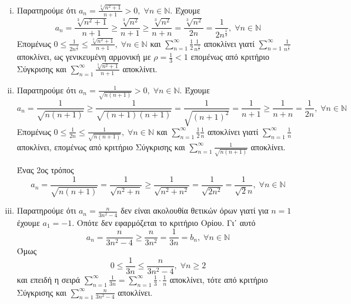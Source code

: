 \begin{enumerate}
\begin{enumerate}[i)]
      \item Παρατηρούμε ότι $ a_{n} = \frac{\sqrt[3]{n^{2}+1}}{n+1} > 0, \; 
        \forall n \in \mathbb{N} $. Έχουμε
        \[
          a_{n} = \frac{\sqrt[3]{n^{2}+1}}{n+1} \geq \frac{\sqrt[3]{n^{2}}}{n+1} 
          \geq \frac{\sqrt[3]{n^{2}}}{n+n} = \frac{\sqrt[3]{n^{2}}}{2n} =
          \frac{1}{2n^{\frac{1}{3}}}, \; \forall n \in \mathbb{N}
        \] 
        Επομένως $ 0 \leq \frac{1}{2n^{\frac{1}{3}}} \leq 
        \frac{\sqrt[3]{n^{2}+1} }{n+1}, \; \forall n \in \mathbb{N} $ και 
        $ \sum_{n=1}^{\infty} \frac{1}{2} \frac{1}{n^{\frac{1}{3}}} $ 
        αποκλίνει γιατί $ \sum_{n=1}^{\infty} \frac{1}{n^{\frac{1}{3}}} $ 
        αποκλίνει, ως γενικευμένη αρμονική με $ \rho = \frac{1}{3} < 1 $ 
        επομένως από κριτήριο Σύγκρισης και $ \sum_{n=1}^{\infty} 
        \frac{\sqrt[3]{n^{2}+1}}{n+1} $ αποκλίνει.

      \item Παρατηρούμε ότι $ a_{n} = \frac{1}{\sqrt{n(n+1)}} > 0, \; \forall n 
        \in \mathbb{N} $. Έχουμε
        \[
          a_{n} = \frac{1}{\sqrt{n(n+1)}} \geq \frac{1}{\sqrt{(n+1)(n+1)}} = 
          \frac{1}{\sqrt{(n+1)^{2}} } = \frac{1}{n+1} \geq \frac{1}{n+n} = 
          \frac{1}{2n}, \; \forall n \in \mathbb{N}   
        \] 
        Επομένως $ 0 \leq \frac{1}{2n} \leq \frac{1}{\sqrt{n(n+1)}}, \; 
        \forall n \in \mathbb{N} $ και $ \sum_{n=1}^{\infty} \frac{1}{2} 
        \frac{1}{n} $ αποκλίνει γιατί $ \sum_{n=1}^{\infty} \frac{1}{n} $ 
        αποκλίνει, επομένως από κριτήριο Σύγκρισης και 
        $ \sum_{n=1}^{\infty} \frac{1}{\sqrt{n(n+1)}} $ αποκλίνει.

        \begin{rem}
          Ένας 2ος τρόπος
          \[
            a_{n} = \frac{1}{\sqrt{n(n+1)}} = \frac{1}{\sqrt{n^{2}+n}} \geq 
            \frac{1}{\sqrt{n^{2}+n^{2}}} = \frac{1}{\sqrt{2n^{2}}} = 
            \frac{1}{\sqrt{2}n}, \; \forall n \in \mathbb{N}   
          \] 
        \end{rem}

      \item Παρατηρούμε ότι $ a_{n}= \frac{n}{3n^{2}-4} $ δεν είναι ακολουθία 
        θετικών όρων γιατί για $ n=1 $ έχουμε $ a_{1} = -1 $. Οπότε δεν 
        εφαρμόζεται το κριτήριο Ορίου. Γι᾽ αυτό 
        \[
          a_{n}= \frac{n}{3n^{2}-4} \geq \frac{n}{3n^{2}} = \frac{1}{3n} =b_{n}, 
          \; \forall n \in \mathbb{N}
        \] 
        Όμως 
        \[
          0 \leq \frac{1}{3n} \leq \frac{n}{3n^{2}-4}, \; \forall n \geq 2 
        \]
        και επειδή η σειρά $ \sum_{n=1}^{\infty} \frac{1}{3n} = 
        \sum_{n=1}^{\infty} \frac{1}{3} \cdot \frac{1}{n}$ αποκλίνει, 
        τότε από κριτήριο Σύγκρισης και 
        $ \sum_{n=1}^{\infty} \frac{n}{3n^{2}-4}$ αποκλίνει.



\end{enumerate}
\end{enumerate}
